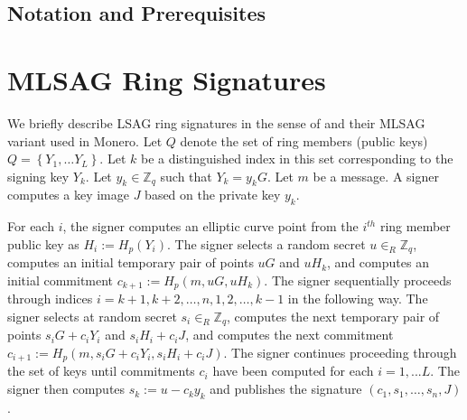 \documentclass[12pt,english,oneside]{mrl}
\theoremstyle{definition}
\numberwithin{equation}{section}
\numberwithin{figure}{section}
\numberwithin{equation}{section}
\numberwithin{equation}{section}
\numberwithin{figure}{section}
\begin{document}



\subsection{Notation and Prerequisites}



\section{MLSAG Ring Signatures}


We briefly describe LSAG ring signatures in the sense of \cite{liu2004linkable} and their MLSAG variant used in Monero. Let $Q$ denote the set of ring members (public keys) $Q=\left\{Y_1, \ldots Y_L\right\}$. Let $k$ be a distinguished index in this set corresponding to the signing key $Y_{k}$. Let $y_{k} \in \mathbb{Z}_q$ such that $Y_{k} = y_{k} G$. Let $m$ be a message. A signer computes a key image $J$ based on the private key $y_{k}$. %

For each $i$, the signer computes an elliptic curve point from the $i^{th}$ ring member public key  as $H_i := H_{p}(Y_i)$. The signer selects a random secret $u \in_R \mathbb{Z}_q$, computes an initial temporary pair of points $uG$ and $uH_{k}$, and computes an initial commitment $c_{k+1} := H_{p}(m,uG, uH_k)$. The signer sequentially proceeds through indices $i=k+1, k+2, \ldots, n, 1, 2, \ldots, k-1$ in the following way. The signer selects at random secret $s_i \in_R \mathbb{Z}_q$, computes the next temporary pair of points $s_iG + c_i Y_i$ and $s_i H_i + c_i J$, and computes the next commitment $c_{i+1}:=H_{p}(m,s_i G + c_i Y_i, s_i H_i + c_i J)$. The signer continues proceeding through the set of keys until commitments $c_i$ have been computed for each $i=1, ... L$. The signer then computes $s_{k}:=u - c_{k}y_{k}$ and publishes the signature $(c_1, s_1, \ldots, s_n, J)$.
\end{document}
